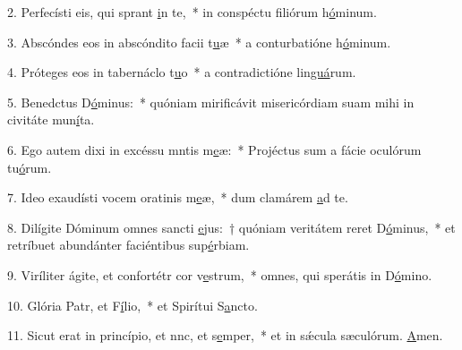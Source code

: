 2. Perfecísti eis, qui sprant \uline{i}n te,~* in conspéctu filiórum h\uline{ó}minum.\par 
3. Abscóndes eos in abscóndito facii t\uline{u}æ~* a conturbatióne h\uline{ó}minum.\par 
4. Próteges eos in tabernáclo t\uline{u}o~* a contradictióne lin\uline{guá}rum.\par 
5. Benedctus D\uline{ó}minus:~* quóniam mirificávit misericórdiam suam mihi in civitáte mun\uline{í}ta.\par 
6. Ego autem dixi in excéssu mntis m\uline{e}æ:~* Projéctus sum a fácie oculórum tu\uline{ó}rum.\par 
7. Ideo exaudísti vocem oratinis m\uline{e}æ,~* dum clamárem \uline{a}d te.\par 
8. Dilígite Dóminum omnes sancti \uline{e}jus:~† quóniam veritátem reret D\uline{ó}minus,~* et retríbuet abundánter faciéntibus sup\uline{é}rbiam.\par 
9. Viríliter ágite, et confortétr cor v\uline{e}strum,~* omnes, qui sperátis in D\uline{ó}mino.\par 
10. Glória Patr, et F\uline{í}lio,~* et Spirítui S\uline{a}ncto.\par 
11. Sicut erat in princípio, et nnc, et s\uline{e}mper,~* et in sǽcula sæculórum. \uline{A}men.\par 
